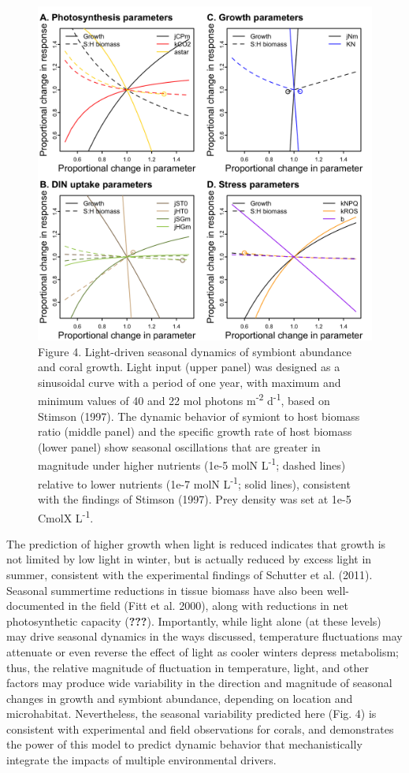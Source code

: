 \documentclass[]{elsarticle} %
\makeatletter
\def\maxwidth{\ifdim\Gin@nat@width>\linewidth\linewidth
\else\Gin@nat@width\fi}
\let\Oldincludegraphics\includegraphics
\renewcommand{\includegraphics}[1]{\Oldincludegraphics[width=\maxwidth]{#1}}
\makeatother
\begin{document}
\begin{figure}[htbp]
\centering
\includegraphics{../img/Fig4.png}
\caption{Figure 4. Light-driven seasonal dynamics of symbiont abundance
and coral growth. Light input (upper panel) was designed as a sinusoidal
curve with a period of one year, with maximum and minimum values of 40
and 22 mol photons m\textsuperscript{-2} d\textsuperscript{-1}, based on
Stimson (1997). The dynamic behavior of symiont to host biomass ratio
(middle panel) and the specific growth rate of host biomass (lower
panel) show seasonal oscillations that are greater in magnitude under
higher nutrients (1e-5 molN L\textsuperscript{-1}; dashed lines)
relative to lower nutrients (1e-7 molN L\textsuperscript{-1}; solid
lines), consistent with the findings of Stimson (1997). Prey density was
set at 1e-5 CmolX L\textsuperscript{-1}.}
\end{figure}

The prediction of higher growth when light is reduced indicates that
growth is not limited by low light in winter, but is actually reduced by
excess light in summer, consistent with the experimental findings of
Schutter et al. (2011). Seasonal summertime reductions in tissue biomass
have also been well-documented in the field (Fitt et al. 2000), along
with reductions in net photosynthetic capacity (\textbf{???}).
Importantly, while light alone (at these levels) may drive seasonal
dynamics in the ways discussed, temperature fluctuations may attenuate
or even reverse the effect of light as cooler winters depress
metabolism; thus, the relative magnitude of fluctuation in temperature,
light, and other factors may produce wide variability in the direction
and magnitude of seasonal changes in growth and symbiont abundance,
depending on location and microhabitat. Nevertheless, the seasonal
variability predicted here (Fig. 4) is consistent with experimental and
field observations for corals, and demonstrates the power of this model
to predict dynamic behavior that mechanistically integrate the impacts
of multiple environmental drivers.
\end{document}
